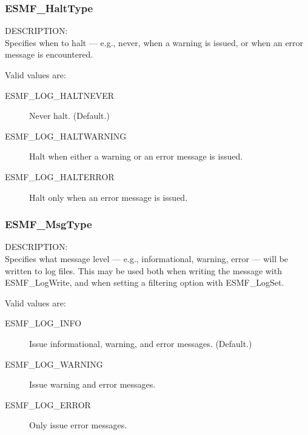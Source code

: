 

\subsubsection{ESMF\_HaltType}

\label{opt:Halttype}
{\sf DESCRIPTION:\\}
Specifies when to halt --- e.g., never, when a warning is issued, or when an
error message is encountered.

Valid values are:
\begin{description}
   \item [ESMF\_LOG\_HALTNEVER] 
         Never halt.  (Default.)
   \item [ESMF\_LOG\_HALTWARNING]
         Halt when either a warning or an error message is issued.
   \item [ESMF\_LOG\_HALTERROR]
         Halt only when an error message is issued.
\end{description}

\subsubsection{ESMF\_MsgType}

\label{opt:msgtype}
{\sf DESCRIPTION:\\}
Specifies what message level --- e.g., informational, warning, 
error --- will be written to log files.  This may be used both when
writing the message with ESMF\_LogWrite, and when setting a filtering
option with ESMF\_LogSet.

Valid values are:
\begin{description}
   \item [ESMF\_LOG\_INFO] 
         Issue informational, warning, and error messages.  (Default.)
   \item [ESMF\_LOG\_WARNING]
         Issue warning and error messages.
   \item [ESMF\_LOG\_ERROR]
         Only issue error messages.
\end{description}


